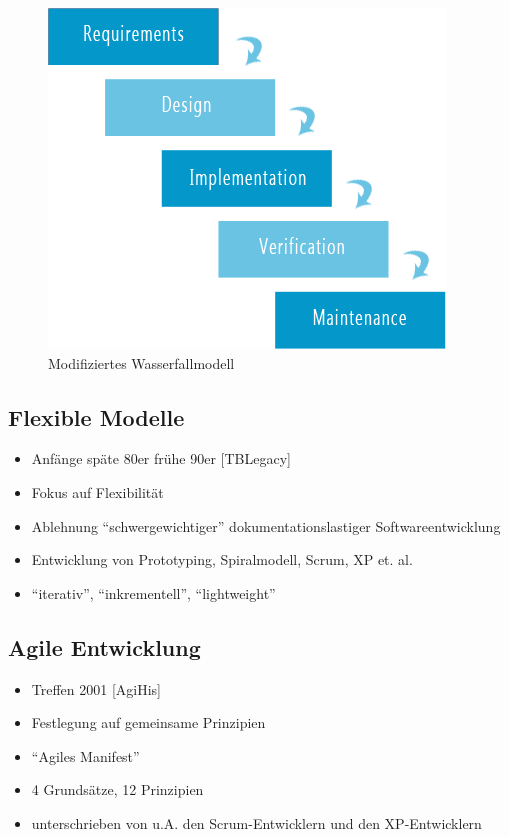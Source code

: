 \documentclass[%
	handout
]{beamer}
\newcommand{\tblegacy}{[TBLegacy]}
\newcommand{\agimh}{[AgiHis]}
\begin{document}
		\begin{frame}[fragile]
			\begin{figure}
				\begin{center}
					\includegraphics[scale=.5]{../images/waterfall.png}
					\caption{Modifiziertes Wasserfallmodell}
					\label{img:waterfall}
				\end{center}
			\end{figure}
		\end{frame}
	\subsection{Flexible Modelle}
		\begin{frame}
			\begin{itemize}
				\item Anfänge späte 80er frühe 90er \tblegacy\pause
				\item Fokus auf Flexibilität\pause
				\item Ablehnung ``schwergewichtiger'' dokumentationslastiger Softwareentwicklung\pause
				\item Entwicklung von Prototyping, Spiralmodell, Scrum, XP et. al.\pause
				\item ``iterativ'', ``inkrementell'', ``lightweight''
			\end{itemize}
		\end{frame}
	\subsection{Agile Entwicklung}
		\begin{frame}
			\begin{itemize}
				\item Treffen 2001 \agimh\pause
				\item Festlegung auf gemeinsame Prinzipien\pause
				\item ``Agiles Manifest''\pause
				\item 4 Grundsätze, 12 Prinzipien\pause
				\item unterschrieben von u.A. den Scrum-Entwicklern und den XP-Entwicklern
			\end{itemize}
		\end{frame}
		
\end{document}
